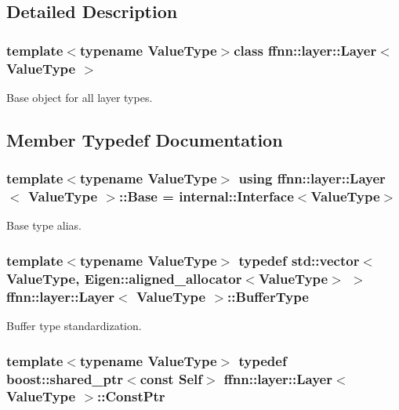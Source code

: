 \subsection{Detailed Description}
\subsubsection*{template$<$typename Value\-Type$>$class ffnn\-::layer\-::\-Layer$<$ Value\-Type $>$}

Base object for all layer types. 

\subsection{Member Typedef Documentation}
\hypertarget{classffnn_1_1layer_1_1_layer_a54b8c1b013fe141fbfc7f4dc63ab6882}{
\subsubsection[{Base}]{\setlength{\rightskip}{0pt plus 5cm}template$<$typename Value\-Type$>$ using {\bf ffnn\-::layer\-::\-Layer}$<$ Value\-Type $>$\-::{\bf Base} =  {\bf internal\-::\-Interface}$<$Value\-Type$>$}}\label{classffnn_1_1layer_1_1_layer_a54b8c1b013fe141fbfc7f4dc63ab6882}


Base type alias. 

\hypertarget{classffnn_1_1layer_1_1_layer_a3f2e9c375d9bcf80e6000e9e53ba212d}{
\subsubsection[{Buffer\-Type}]{\setlength{\rightskip}{0pt plus 5cm}template$<$typename Value\-Type$>$ typedef std\-::vector$<$Value\-Type, Eigen\-::aligned\-\_\-allocator$<$Value\-Type$>$ $>$ {\bf ffnn\-::layer\-::\-Layer}$<$ Value\-Type $>$\-::{\bf Buffer\-Type}}}\label{classffnn_1_1layer_1_1_layer_a3f2e9c375d9bcf80e6000e9e53ba212d}


Buffer type standardization. 

\hypertarget{classffnn_1_1layer_1_1_layer_ad7c9ea196243e78b9c1e4a3a1a17988b}{
\subsubsection[{Const\-Ptr}]{\setlength{\rightskip}{0pt plus 5cm}template$<$typename Value\-Type$>$ typedef boost\-::shared\-\_\-ptr$<$const {\bf Self}$>$ {\bf ffnn\-::layer\-::\-Layer}$<$ Value\-Type $>$\-::{\bf Const\-Ptr}}}\label{classffnn_1_1layer_1_1_layer_ad7c9ea196243e78b9c1e4a3a1a17988b}


